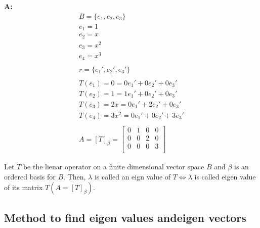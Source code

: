 \documentclass[english,course,fleqn]{lecture}
\newenvironment{qanda}{\begin{enumerate}\setlength{\parindent}{0pt}}{\medskip\end{enumerate}}
\newcommand{\A}{\par\textbf{A:} \normalfont}
\begin{document}
\begin{qanda}
  \A \begin{gather*}
    B = \{e_{1}, e_{2}, e_{3}\}\\
    e_{1} = {1}\\
    e_{2} = {x}\\
    e_{3} = {x^{2}}\\
    e_{4} = x^{3}\\
    \\
    r = \{e_{1}', e_{2}', e_{3}'\}\\
    \\
    T(e_{1}) = 0 = 0e_{1}' + 0e_{2}' + 0e_{3}'\\
    T(e_{2}) = 1 = 1e_{1}' + 0e_{2}' + 0e_{3}'\\
    T(e_{3}) = 2x = 0e_{1}' + 2e_{2}' + 0e_{3}'\\
    T(e_{4}) = 3x^{2} = 0e_{1}' + 0e_{2}' + 3e_{3}'\\
    \\
    A = {[T]}_{\beta} = \begin{bmatrix}
      0 & 1 & 0 & 0 \\
      0 & 0 & 2 & 0\\
      0 & 0 & 0 & 3 \\
    \end{bmatrix}
    \end{gather*}
  \end{qanda}

  \newpage


  \begin{theorem}[]
    Let $T$ be the lienar operator on a finite dimensional vector space $B$ and $\beta$ is an ordered basis for $B$.
    Then, $\lambda$ is called an eign value of $T \iff \lambda$ is called eigen value of its matrix $T (A = {[T]}_{\beta})$.
  \end{theorem}

  \subsection{Method to find eigen values andeigen vectors}
\end{document}
